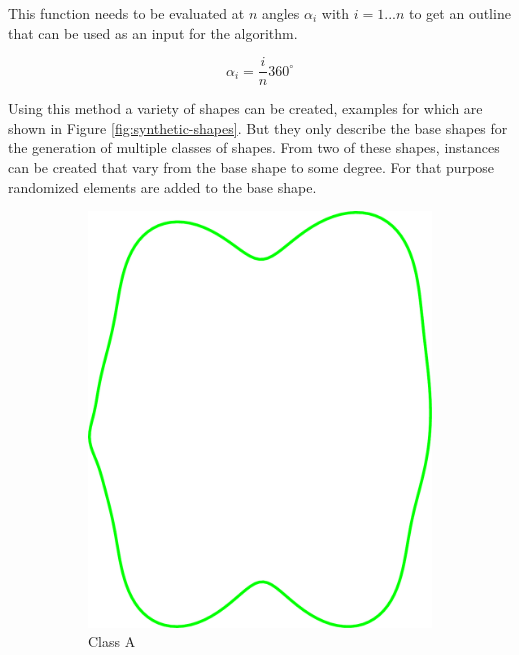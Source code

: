\documentclass[pdftex,12pt,a4paper]{report}
\begin{document}
This function needs to be evaluated at $n$ angles $\alpha_i$ with $i = 1 ... n$ to get an outline that can be used as an input for the algorithm.

\begin{equation}
	\alpha_i = \frac{i}{n} 360^{\circ}
\end{equation}

Using this method a variety of shapes can be created, examples for which are shown in Figure \ref{fig:synthetic-shapes}. But they only describe the base shapes for the generation of multiple classes of shapes. From two of these shapes, instances can be created that vary from the base shape to some degree. For that purpose randomized elements are added to the base shape.

\begin{figure}
	\centering
	\begin{subfigure}[b]{0.24\textwidth}
		\centering
		\includegraphics[width=.9\linewidth]{img/synthetic-generation/classes/1-1.pdf}
		\caption{Class A}
		\label{subfig:synthetic-classes:a-1}
	\end{subfigure}
	\begin{subfigure}[b]{0.24\textwidth}
		\centering

\end{subfigure}
\end{figure}
\end{document}
